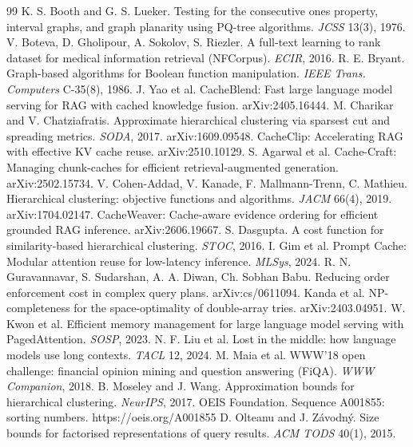 \documentclass[11pt]{article}
\theoremstyle{plain}
\begin{document}
\begin{thebibliography}{99}
 K. S. Booth and G. S. Lueker. Testing for the consecutive ones property, interval graphs, and graph planarity using PQ-tree algorithms. \emph{JCSS} 13(3), 1976.
 V. Boteva, D. Gholipour, A. Sokolov, S. Riezler. A full-text learning to rank dataset for medical information retrieval (NFCorpus). \emph{ECIR}, 2016.
 R. E. Bryant. Graph-based algorithms for Boolean function manipulation. \emph{IEEE Trans. Computers} C-35(8), 1986.
 J. Yao et al. CacheBlend: Fast large language model serving for RAG with cached knowledge fusion. arXiv:2405.16444.
 M. Charikar and V. Chatziafratis. Approximate hierarchical clustering via sparsest cut and spreading metrics. \emph{SODA}, 2017. arXiv:1609.09548.
 CacheClip: Accelerating RAG with effective KV cache reuse. arXiv:2510.10129.
 S. Agarwal et al. Cache-Craft: Managing chunk-caches for efficient retrieval-augmented generation. arXiv:2502.15734.
 V. Cohen-Addad, V. Kanade, F. Mallmann-Trenn, C. Mathieu. Hierarchical clustering: objective functions and algorithms. \emph{JACM} 66(4), 2019. arXiv:1704.02147.
 CacheWeaver: Cache-aware evidence ordering for efficient grounded RAG inference. arXiv:2606.19667.
 S. Dasgupta. A cost function for similarity-based hierarchical clustering. \emph{STOC}, 2016.
 I. Gim et al. Prompt Cache: Modular attention reuse for low-latency inference. \emph{MLSys}, 2024.
 R. N. Guravannavar, S. Sudarshan, A. A. Diwan, Ch. Sobhan Babu. Reducing order enforcement cost in complex query plans. arXiv:cs/0611094.
 Kanda et al. NP-completeness for the space-optimality of double-array tries. arXiv:2403.04951.
 W. Kwon et al. Efficient memory management for large language model serving with PagedAttention. \emph{SOSP}, 2023.
 N. F. Liu et al. Lost in the middle: how language models use long contexts. \emph{TACL} 12, 2024.
 M. Maia et al. WWW'18 open challenge: financial opinion mining and question answering (FiQA). \emph{WWW Companion}, 2018.
 B. Moseley and J. Wang. Approximation bounds for hierarchical clustering. \emph{NeurIPS}, 2017.
 OEIS Foundation. Sequence A001855: sorting numbers. https://oeis.org/A001855
 D. Olteanu and J. Závodný. Size bounds for factorised representations of query results. \emph{ACM TODS} 40(1), 2015.

\end{thebibliography}
\end{document}
